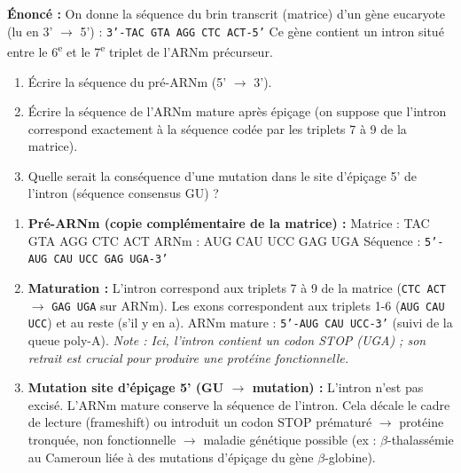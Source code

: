 \documentclass[11pt]{article}
\begin{document}
\begin{exercice}
\textbf{Énoncé :} On donne la séquence du brin transcrit (matrice) d'un gène eucaryote (lu en 3' $\to$ 5') :
\texttt{3'-TAC GTA AGG CTC ACT-5'}
Ce gène contient un intron situé entre le 6\textsuperscript{e} et le 7\textsuperscript{e} triplet de l'ARNm précurseur.
\begin{enumerate}
\item Écrire la séquence du pré-ARNm (5' $\to$ 3').
\item Écrire la séquence de l'ARNm mature après épiçage (on suppose que l'intron correspond exactement à la séquence codée par les triplets 7 à 9 de la matrice).
\item Quelle serait la conséquence d'une mutation dans le site d'épiçage 5' de l'intron (séquence consensus GU) ?
\end{enumerate}
\end{exercice}

\begin{corrige}[Exercice n]
\begin{enumerate}
\item \textbf{Pré-ARNm (copie complémentaire de la matrice) :}
Matrice : TAC GTA AGG CTC ACT
ARNm : \quad AUG CAU UCC GAG UGA
Séquence : \texttt{5'-AUG CAU UCC GAG UGA-3'}

\item \textbf{Maturation :} L'intron correspond aux triplets 7 à 9 de la matrice (\texttt{CTC ACT} $\to$ \texttt{GAG UGA} sur ARNm).
Les exons correspondent aux triplets 1-6 (\texttt{AUG CAU UCC}) et au reste (s'il y en a).
ARNm mature : \texttt{5'-AUG CAU UCC-3'} (suivi de la queue poly-A). \textit{Note : Ici, l'intron contient un codon STOP (UGA) ; son retrait est crucial pour produire une protéine fonctionnelle.}

\item \textbf{Mutation site d'épiçage 5' (GU $\to$ mutation) :} L'intron n'est pas excisé. L'ARNm mature conserve la séquence de l'intron. Cela décale le cadre de lecture (frameshift) ou introduit un codon STOP prématuré $\to$ protéine tronquée, non fonctionnelle $\to$ maladie génétique possible (ex : $\beta$-thalassémie au Cameroun liée à des mutations d'épiçage du gène $\beta$-globine).
\end{enumerate}
\end{corrige}
\end{document}
